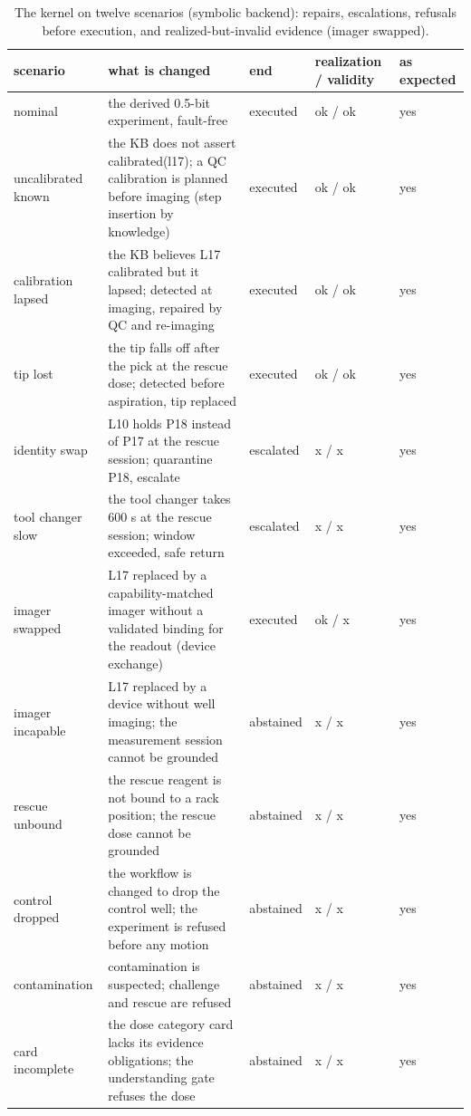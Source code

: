 \documentclass[10.5pt,a4paper]{article}
\begin{document}
\begin{table}[htbp]\centering\footnotesize\caption{The kernel on twelve scenarios (symbolic backend): repairs, escalations, refusals before execution, and realized-but-invalid evidence (imager swapped).}
\begin{tabularx}{\linewidth}{@{}p{2.8cm}Xp{1.5cm}p{1.6cm}p{1.1cm}@{}}\toprule scenario & what is changed & end & realization / validity & as expected \\\midrule
nominal & the derived 0.5-bit experiment, fault-free & executed & ok / ok & yes \\
uncalibrated known & the KB does not assert calibrated(l17); a QC calibration is planned before imaging (step insertion by knowledge) & executed & ok / ok & yes \\
calibration lapsed & the KB believes L17 calibrated but it lapsed; detected at imaging, repaired by QC and re-imaging & executed & ok / ok & yes \\
tip lost & the tip falls off after the pick at the rescue dose; detected before aspiration, tip replaced & executed & ok / ok & yes \\
identity swap & L10 holds P18 instead of P17 at the rescue session; quarantine P18, escalate & escalated & x / x & yes \\
tool changer slow & the tool changer takes 600 s at the rescue session; window exceeded, safe return & escalated & x / x & yes \\
imager swapped & L17 replaced by a capability-matched imager without a validated binding for the readout (device exchange) & executed & ok / x & yes \\
imager incapable & L17 replaced by a device without well imaging; the measurement session cannot be grounded & abstained & x / x & yes \\
rescue unbound & the rescue reagent is not bound to a rack position; the rescue dose cannot be grounded & abstained & x / x & yes \\
control dropped & the workflow is changed to drop the control well; the experiment is refused before any motion & abstained & x / x & yes \\
contamination & contamination is suspected; challenge and rescue are refused & abstained & x / x & yes \\
card incomplete & the dose category card lacks its evidence obligations; the understanding gate refuses the dose & abstained & x / x & yes \\\bottomrule\end{tabularx}\end{table}
\end{document}
